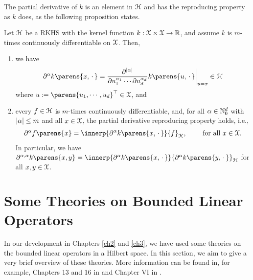 The partial derivative of $k$ is an element in $\mathcal{H}$ and has the reproducing property as $k$ does, as the following proposition states. 

\begin{proposition}\label{prop-reproducing-derivative}
	Let $\mathcal{H}$ be a RKHS with the kernel function $k: \mathcal{X} \times \mathcal{X} \to \mathbb{R}$, and assume $k$ is $m$-times continuously differentiable on $\mathcal{X}$. Then, 
	\begin{enumerate}[label=(\alph*)]
		\item we have 
		\begin{align}
			\partial^{\alpha} k \parens{x, \,\cdot\,} 
			= \frac{\partial^{\abs{\alpha}}}{\partial u_1^{\alpha_1} \cdots \partial u_d^{\alpha_d}} k \parens{u, \,\cdot\,}\bigg\vert_{u=x} \in \calH
		\end{align}
		where $u := \parens{u_1, \cdots, u_d}^\top \in \calX$, and 
		\item every $f \in \mathcal{H}$ is $m$-times continuously differentiable, and, for all $\alpha \in \mathbb{N}_0^d$ with $\lvert\alpha\rvert \le m$ and all $x \in \mathcal{X}$, the partial derivative reproducing property holds, i.e., 
		\begin{align}
			\partial^{\alpha} f \parens{x} = \innerp{\partial^{\alpha} k \parens{x, \,\cdot\,}}{f}_{\calH}, \qquad \text{ for all } x \in \calX. %
		\end{align}
		In particular, we have $\partial^{\alpha, \alpha} k \parens{x, y} = \innerp{\partial^{\alpha} k \parens{x, \,\cdot\,}}{\partial^{\alpha} k \parens{y,\,\cdot\,}}_{\calH}$ for all $x, y \in \mathcal{X}$. 
	\end{enumerate}
\end{proposition}


\section{Some Theories on Bounded Linear Operators}\label{section-bdd-linear-operator}

In our development in Chapters \ref{ch2} and \ref{ch3}, we have used some theories on the bounded linear operators in a Hilbert space. In this section, we aim to give a very brief overview of these theories. More information can be found in, for example, Chapters 13 and 16 in \textcite{Royden2018-cd} and Chapter VI in \textcite{Reed2012-xs}. 

